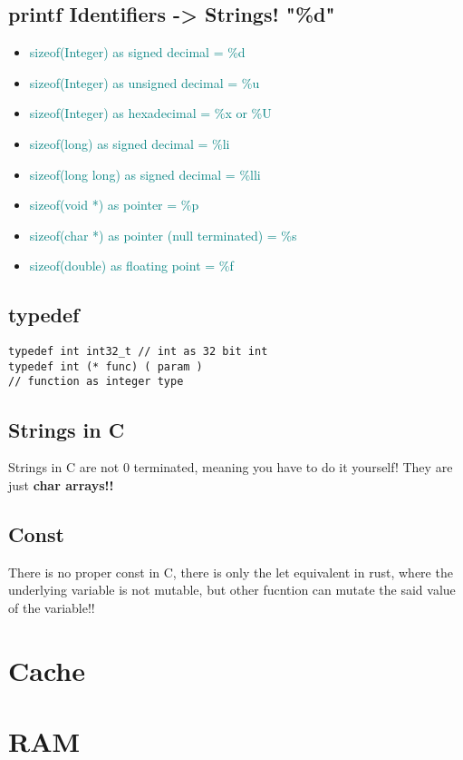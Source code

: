 \documentclass[main.tex,fontsize=8pt,paper=a4,paper=landscape,DIV=calc,]{scrartcl}
\begin{document}
\begin{multicols*}{4}
\subsection{printf Identifiers -> Strings! "\%d"}
\begin{itemize}
\item \textcolor{teal}{sizeof(Integer) as signed decimal = \%d}
\item \textcolor{teal}{sizeof(Integer) as unsigned decimal = \%u}
\item \textcolor{teal}{sizeof(Integer) as hexadecimal = \%x or \%U}
\item \textcolor{teal}{sizeof(long) as signed decimal = \%li}
\item \textcolor{teal}{sizeof(long long) as signed decimal = \%lli}
\item \textcolor{teal}{sizeof(void *) as pointer = \%p}
\item \textcolor{teal}{sizeof(char *) as pointer (null terminated) = \%s}
\item \textcolor{teal}{sizeof(double) as floating point = \%f}
\end{itemize}

\subsection{typedef}
\begin{lstlisting}
typedef int int32_t // int as 32 bit int 
typedef int (* func) ( param )
// function as integer type
\end{lstlisting}
\vspace{2mm}

\subsection{Strings in C}
Strings in C are not 0 terminated, meaning you have to do it yourself!
They are just \textbf{char arrays!!}

\subsection{Const}
There is no proper const in C, there is only the let equivalent in rust, where the underlying variable is not mutable, but other fucntion can mutate the said value of the variable!!

\section{Cache}


\section{RAM}

\end{multicols*}
\end{document}
